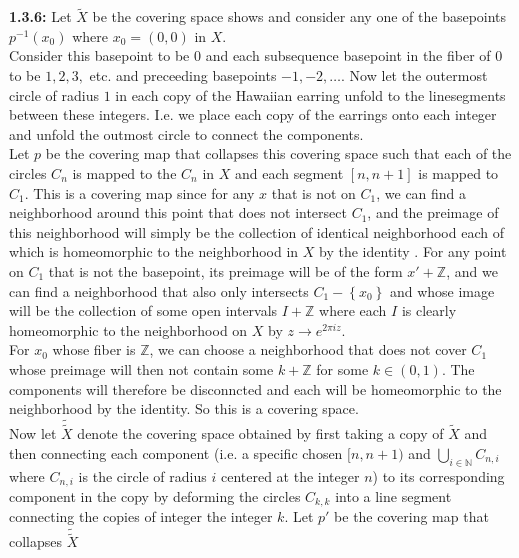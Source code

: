 \documentclass[a4paper]{article}
\begin{document}
    \textbf{1.3.6:} Let
    $\tilde{X}$ be the covering space shows and
    consider any one of the basepoints
    $p^{-1}(x_0)$ where $x_0 = (0,0)$ in $X$.\\
    Consider this basepoint to be $0$ 
    and each subsequence basepoint in the fiber
    of $0$ to be $1,2,3,$ etc. and preceeding basepoints
    $-1, -2, \ldots$. Now let the outermost
    circle of radius $1$ in each copy of the Hawaiian earring
    unfold to the linesegments
    between these integers. I.e. we place each
    copy of the earrings onto each integer and unfold
    the outmost circle to connect the components.\\
    Let  $p$ be the covering map that
    collapses this covering space such that
    each of the circles $C_n$ is mapped to the
    $C_n$ in $X$ and each segment $\left[ n,n+1 \right] $ 
    is mapped to $C_1$.
    This is a covering map since for any $x$ that is not on $C_1$, we can find a neighborhood around this point
    that does not intersect $C_1$, and the preimage of this neighborhood
    will simply be the collection of identical neighborhood each of which
    is homeomorphic to the neighborhood in $X$ by the identity
    . For any point on  $C_1$ that is not the basepoint,
    its preimage will be of the form $x' + \mathbb{Z}$, and we
    can find a neighborhood that also only intersects $C_1 - \left\{ x_0 \right\} $ and
    whose image will be the collection of some open intervals
    $I + \mathbb{Z}$ where each $I$ is clearly homeomorphic
    to the neighborhood on $X$ by $z \to e^{2 \pi i z}$.\\
    For $x_0$ whose fiber is $\mathbb{Z}$, we can
    choose a neighborhood that does not cover $C_1$ whose
    preimage will then not contain some
    $k + \mathbb{Z}$ for some $ k \in (0,1)$. The components
    will therefore be disconncted and each will be homeomorphic
    to the neighborhood by the identity. So this is a 
    covering space.\\
    \linebreak
    Now let $\tilde{\tilde{X}}$ denote the covering space
    obtained by first taking a copy of $\tilde{X}$ and
    then connecting each component (i.e. 
    a specific chosen $[n,n+1)$ and  $\bigcup_{i \in \mathbb{N}} C_{n,i}$ 
    where $C_{n,i}$ is the circle of radius $i$ centered at
    the integer $n$) to its corresponding component
    in the copy by deforming the circles
    $C_{k,k}$ into a line segment connecting the copies of
    integer the integer  $k$. Let
    $p'$ be the covering map that collapses $\tilde{\tilde{X}}$ 
\end{document}
